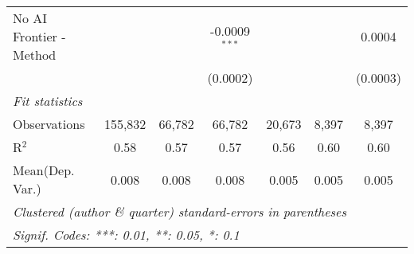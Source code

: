 \begin{tabular}{lcccccc}
   No AI Frontier - Method &                 &                & -0.0009$^{***}$ &          &          & 0.0004\\   
                           &                 &                & (0.0002)        &          &          & (0.0003)\\   
   \midrule
   \emph{Fit statistics}\\
   Observations            & 155,832         & 66,782         & 66,782          & 20,673   & 8,397    & 8,397\\  
   R$^2$                   & 0.58            & 0.57           & 0.57            & 0.56     & 0.60     & 0.60\\  
Mean(Dep. Var.) & 0.008 & 0.008 & 0.008 & 0.005 & 0.005 & 0.005 \\
   \midrule \midrule
   \multicolumn{7}{l}{\emph{Clustered (author \& quarter) standard-errors in parentheses}}\\
   \multicolumn{7}{l}{\emph{Signif. Codes: ***: 0.01, **: 0.05, *: 0.1}}\\
\end{tabular}
\par\endgroup
